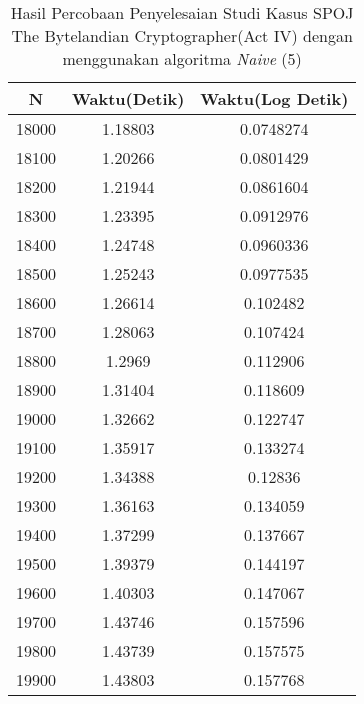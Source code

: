 \begin{table}[H]
\centering
\caption {Hasil Percobaan Penyelesaian Studi Kasus SPOJ The Bytelandian Cryptographer(Act IV) dengan menggunakan algoritma \textit{Naive} (5)}
\begin{tabular}{|c|c|c|}\hline
N&Waktu(Detik)&Waktu(Log Detik)\\ \hline
18000&1.18803&0.0748274\\ \hline
18100&1.20266&0.0801429\\ \hline
18200&1.21944&0.0861604\\ \hline
18300&1.23395&0.0912976\\ \hline
18400&1.24748&0.0960336\\ \hline
18500&1.25243&0.0977535\\ \hline
18600&1.26614&0.102482\\ \hline
18700&1.28063&0.107424\\ \hline
18800&1.2969&0.112906\\ \hline
18900&1.31404&0.118609\\ \hline
19000&1.32662&0.122747\\ \hline
19100&1.35917&0.133274\\ \hline
19200&1.34388&0.12836\\ \hline
19300&1.36163&0.134059\\ \hline
19400&1.37299&0.137667\\ \hline
19500&1.39379&0.144197\\ \hline
19600&1.40303&0.147067\\ \hline
19700&1.43746&0.157596\\ \hline
19800&1.43739&0.157575\\ \hline
19900&1.43803&0.157768\\ \hline
\end{tabular}
\label{tab:res10}
\end{table}